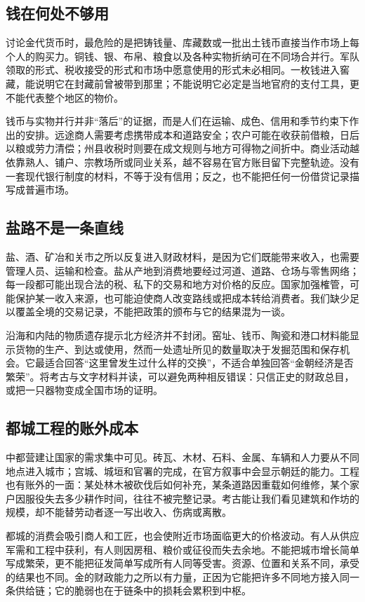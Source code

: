 \subsection{钱在何处不够用}

讨论金代货币时，最危险的是把铸钱量、库藏数或一批出土钱币直接当作市场上每个人的购买力。铜钱、银、布帛、粮食以及各种实物折纳可在不同场合并行。军队领取的形式、税收接受的形式和市场中愿意使用的形式未必相同。一枚钱进入窖藏，能说明它在封藏前曾被带到那里；不能说明它必定是当地官府的支付工具，更不能代表整个地区的物价。

钱币与实物并行并非“落后”的证据，而是人们在运输、成色、信用和季节约束下作出的安排。远途商人需要考虑携带成本和道路安全；农户可能在收获前借粮，日后以粮或劳力清偿；州县收税时则要在成文规则与地方可得物之间折中。商业活动越依靠熟人、铺户、宗教场所或同业关系，越不容易在官方账目留下完整轨迹。没有一套现代银行制度的材料，不等于没有信用；反之，也不能把任何一份借贷记录描写成普遍市场。

\subsection{盐路不是一条直线}

盐、酒、矿冶和关市之所以反复进入财政材料，是因为它们既能带来收入，也需要管理人员、运输和检查。盐从产地到消费地要经过河道、道路、仓场与零售网络；每一段都可能出现合法的税、私下的交易和地方对价格的反应。国家加强榷管，可能保护某一收入来源，也可能迫使商人改变路线或把成本转给消费者。我们缺少足以覆盖全境的交易记录，不能把政策的颁布与它的结果混为一谈。

沿海和内陆的物质遗存提示北方经济并不封闭。窑址、钱币、陶瓷和港口材料能显示货物的生产、到达或使用，然而一处遗址所见的数量取决于发掘范围和保存机会。它最适合回答“这里曾发生过什么样的交换”，不适合单独回答“金朝经济是否繁荣”。将考古与文字材料并读，可以避免两种相反错误：只信正史的财政总目，或把一只器物变成全国市场的证明。

\subsection{都城工程的账外成本}

中都营建让国家的需求集中可见。砖瓦、木材、石料、金属、车辆和人力要从不同地点进入城市；宫城、城垣和官署的完成，在官方叙事中会显示朝廷的能力。工程也有账外的一面：某处林木被砍伐后如何补充，某条道路因重载如何维修，某个家户因服役失去多少耕作时间，往往不被完整记录。考古能让我们看见建筑和作坊的规模，却不能替劳动者逐一写出收入、伤病或离散。

都城的消费会吸引商人和工匠，也会使附近市场面临更大的价格波动。有人从供应军需和工程中获利，有人则因房租、粮价或征役而失去余地。不能把城市增长简单写成繁荣，更不能把征发简单写成所有人同等受害。资源、位置和关系不同，承受的结果也不同。金的财政能力之所以有力量，正因为它能把许多不同地方接入同一条供给链；它的脆弱也在于链条中的损耗会累积到中枢。

